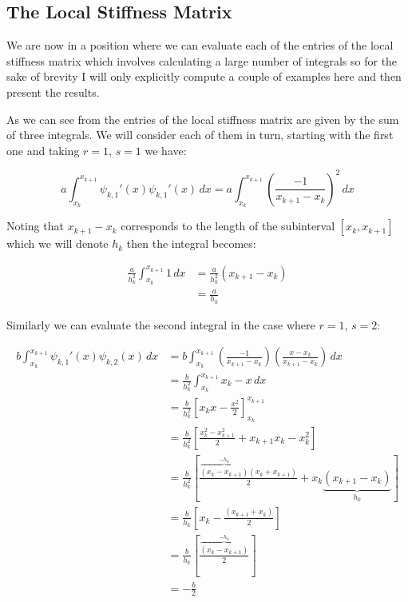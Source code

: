 \subsection{The Local Stiffness Matrix}

We are now in a position where we can evaluate each of the entries of the local
stiffness matrix which involves calculating a large number of integrals so for
the sake of brevity I will only explicitly compute a couple of examples here
and then present the results.

As we can see from  the entries of
the local stiffness matrix are given by the sum of three integrals. We will
consider each of them in turn, starting with the first one and taking $r = 1$,
$s = 1$ we have:

\begin{equation*}
       a\int_{x_k}^{x_{k+1}}\psi_{k,1}'(x)\psi_{k,1}'(x)\, dx =
         a\int_{x_k}^{x_{k+1}}\left(\frac{-1}{x_{k+1} - x_k}\right)^2\, dx
\end{equation*}

Noting that $x_{k+1} - x_k$ corresponds to the length of the subinterval
$[x_k, x_{k+1}]$ which we will denote $h_k$ then the integral becomes:

\begin{align*}
    \frac{a}{h_k^2}\int_{x_k}^{x_{k+1}}1\, dx &= \frac{a}{h_k^2}(x_{k+1} - x_k) \\
          &= \frac{a}{h_k}
\end{align*}

Similarly we can evaluate the second integral in the case where $r=1$, $s=2$:

\begin{align*}
    b\int_{x_k}^{x_{k+1}}\psi_{k,1}'(x)\psi_{k,2}(x)\, dx
      &=  b\int_{x_k}^{x_{k+1}}\left(\frac{-1}{x_{k+1} - x_k}\right)
                               \left(\frac{x - x_k}{x_{k+1} - x_k}\right)\, dx \\
      &= \frac{b}{h_k^2}\int_{x_k}^{x_{k+1}}x_k - x\, dx \\
      &= \frac{b}{h_k^2}\left[x_kx - \frac{x^2}{2}\right]_{x_k}^{x_{k+1}} \\
      &= \frac{b}{h_k^2}\left[ \frac{x_k^2 - x_{k+1}^2}{2} + x_{k+1}x_k - x_k^2 \right] \\
      &= \frac{b}{h_k^2}\left[ \frac{\overbrace{(x_k - x_{k+1})}^{-h_k}(x_k + x_{k+1})}{2}
              + x_k\underbrace{(x_{k+1} - x_k)}_{h_k}\right] \\
      &= \frac{b}{h_k}\left[ x_k - \frac{(x_{k+1} + x_k)}{2} \right] \\
      &= \frac{b}{h_k}\left[\frac{\overbrace{(x_k - x_{k+1})}^{-h_k}}{2}\right] \\
      &= -\frac{b}{2}
\end{align*}

